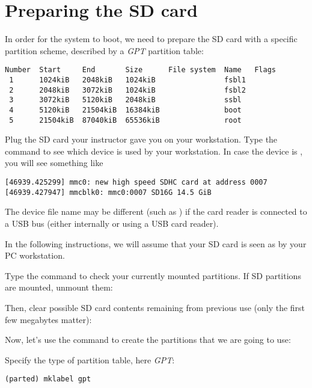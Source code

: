 \section{Preparing the SD card}

In order for the system to boot, we need to prepare the SD card with a
specific partition scheme, described by a {\em GPT} partition table:

\begin{verbatim}
Number  Start     End       Size      File system  Name   Flags
 1      1024kiB   2048kiB   1024kiB                fsbl1
 2      2048kiB   3072kiB   1024kiB                fsbl2
 3      3072kiB   5120kiB   2048kiB                ssbl
 4      5120kiB   21504kiB  16384kiB               boot
 5      21504kiB  87040kiB  65536kiB               root
\end{verbatim}

Plug the SD card your instructor gave you on your workstation. Type
the  command to see which device is used by your
workstation. In case the device is , you will see
something like

\begin{verbatim}
[46939.425299] mmc0: new high speed SDHC card at address 0007
[46939.427947] mmcblk0: mmc0:0007 SD16G 14.5 GiB
\end{verbatim}

The device file name may be different (such as )
if the card reader is connected to a USB bus (either internally
or using a USB card reader).

In the following instructions, we will assume that your SD card is
seen as  by your PC workstation.

Type the  command to check your currently mounted
partitions. If SD partitions are mounted, unmount them:


Then, clear possible SD card contents remaining from previous use
(only the first few megabytes matter):


Now, let's use the  command to create the partitions that
we are going to use:


Specify the type of partition table, here {\em GPT}:

\begin{verbatim}
(parted) mklabel gpt
\end{verbatim}

